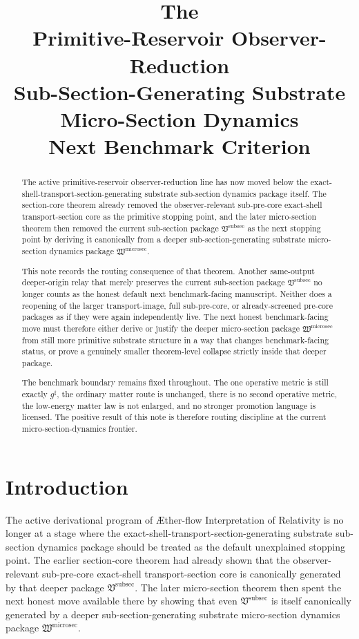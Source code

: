 \documentclass[11pt]{article}
\title{\textbf{The \TheoryName{}}\\[0.4em]
\large Primitive-Reservoir Observer-Reduction\\
\large Sub-Section-Generating Substrate Micro-Section Dynamics\\
\large Next Benchmark Criterion}
\author{}
\date{}
\newcommand{\Aflow}{\AE{}ther-flow}
\newcommand{\TheoryName}{\Aflow{} Interpretation of Relativity}
\newcommand{\CompletedMetric}{g^{\sharp}}
\newcommand{\SubSectionPackage}{\mathfrak V^{\mathrm{subsec}}}
\newcommand{\MicroSectionPackage}{\mathfrak W^{\mathrm{microsec}}}
\begin{document}
\maketitle

\begin{abstract}
The active primitive-reservoir observer-reduction line has now moved below the exact-shell-transport-section-generating substrate sub-section dynamics package itself. The section-core theorem already removed the observer-relevant sub-pre-core exact-shell transport-section core as the primitive stopping point, and the later micro-section theorem then removed the current sub-section package \(\SubSectionPackage\) as the next stopping point by deriving it canonically from a deeper sub-section-generating substrate micro-section dynamics package \(\MicroSectionPackage\).

This note records the routing consequence of that theorem. Another same-output deeper-origin relay that merely preserves the current sub-section package \(\SubSectionPackage\) no longer counts as the honest default next benchmark-facing manuscript. Neither does a reopening of the larger transport-image, full sub-pre-core, or already-screened pre-core packages as if they were again independently live. The next honest benchmark-facing move must therefore either derive or justify the deeper micro-section package \(\MicroSectionPackage\) from still more primitive substrate structure in a way that changes benchmark-facing status, or prove a genuinely smaller theorem-level collapse strictly inside that deeper package.

The benchmark boundary remains fixed throughout. The one operative metric is still exactly \(\CompletedMetric\), the ordinary matter route is unchanged, there is no second operative metric, the low-energy matter law is not enlarged, and no stronger promotion language is licensed. The positive result of this note is therefore routing discipline at the current micro-section-dynamics frontier.
\end{abstract}

\section{Introduction}

The active derivational program of \TheoryName{} is no longer at a stage where the exact-shell-transport-section-generating substrate sub-section dynamics package should be treated as the default unexplained stopping point. The earlier section-core theorem had already shown that the observer-relevant sub-pre-core exact-shell transport-section core is canonically generated by that deeper package \(\SubSectionPackage\). The later micro-section theorem then spent the next honest move available there by showing that even \(\SubSectionPackage\) is itself canonically generated by a deeper sub-section-generating substrate micro-section dynamics package \(\MicroSectionPackage\).
\end{document}
